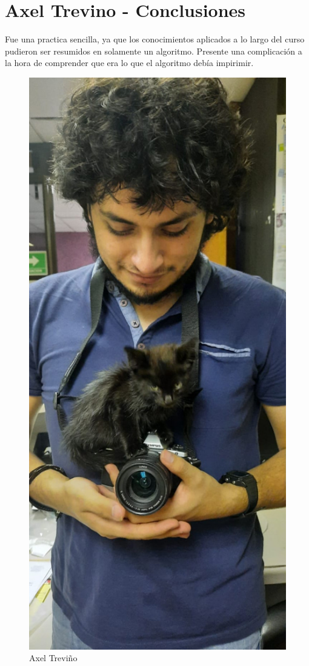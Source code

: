 \newpage
\section{Axel Trevino - Conclusiones}
    Fue una practica sencilla, ya que los conocimientos aplicados a lo largo del curso pudieron ser resumidos en solamente un algoritmo. Presente una complicación a la hora de comprender que era lo que el algoritmo debía impirimir. 
    \begin{figure}[htp!]
            \centering
            \includegraphics[width=0.4 \textwidth]{Images/Fotos_Alumnos/axel.jpg}  
            \caption{Axel Treviño}
            \label{fig:my_label2}
        \end{figure}
